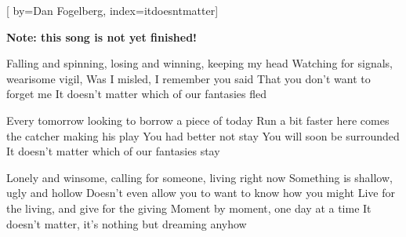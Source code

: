 
[%
    by={Dan Fogelberg},
    index={itdoesntmatter}]


    \label{itdoesntmatter}

    \textbf{Note: this song is not yet finished!}

    \beginverse
        Falling and spinning, losing and winning, keeping my head
        Watching for signals, wearisome vigil,
        Was I misled, I remember you said
        That you don't want to forget me
        It doesn't matter which of our fantasies fled
    \endverse

    \beginverse
        Every tomorrow looking to borrow a piece of today
        Run a bit faster here comes the catcher making his play
        You had better not stay
        You will soon be surrounded
        It doesn't matter which of our fantasies stay
    \endverse

    \beginverse
        Lonely and winsome, calling for someone, living right now
        Something is shallow, ugly and hollow
        Doesn't even allow you to want to know how you might
        Live for the living, and give for the giving
        Moment by moment, one day at a time
        It doesn't matter, it's nothing but dreaming anyhow
    \endverse
\endsong
